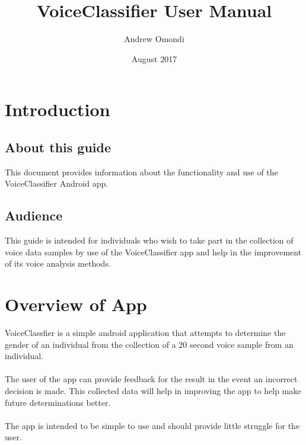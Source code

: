 \documentclass[letterpaper, 12 pt]{report}
\begin{document}
\title{VoiceClassifier User Manual}
\author{Andrew Omondi}
\date{August 2017}
\maketitle
\pagestyle{empty}

\tableofcontents
\newpage

\section{Introduction}
\subsection{About this guide}
This document provides information about the functionality and use of the VoiceClassifier Android app.

\subsection{Audience}
This guide is intended for individuals who wish to take part in the collection of voice data  samples by use of the VoiceClassifier app and help in the improvement of its voice analysis methods.

\newpage


\section{Overview of App}
VoiceClassfier is a simple android application that attempts to determine the gender of an individual from the collection of a 20 second voice sample from an individual. \\ \\
The user of the app can provide feedback for the result in the event an incorrect decision is made. This collected data will help in improving the app to help make future determinations better.  \\ \\
The app is intended to be simple to use and should provide little struggle for the user.
\end{document}
